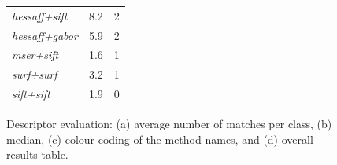 \documentclass[preprint,authoryear,review]{elsarticle}
\begin{document}
\begin{figure}[h]
\begin{center}
{\begin{tabular}{|l|l|l|}
\hline
\textit{hessaff+sift}             & 8.2 & 2\\
\textit{hessaff+gabor}            & 5.9 & 2\\
\textit{mser+sift}                & 1.6 & 1\\
\textit{surf+surf}                & 3.2 & 1\\
\textit{sift+sift}                & 1.9 & 0\\
\hline
\end{tabular}}
\caption{Descriptor evaluation: (a) average number of matches per class,
(b) median,
(c) colour coding of the method names, and
(d) overall results table.
\label{fig:results2}}
\end{center}
\end{figure}
%
\end{document}
